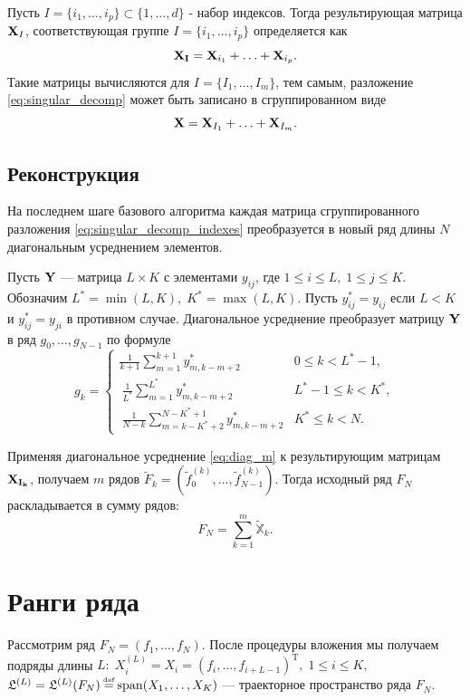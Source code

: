 \documentclass[specialist, substylefile = spbu.rtx,
			   subf, href, 12pt]{disser}
\newcommand\eqdef{\mathrel{\stackrel{\makebox[0pt]{\mbox{\normalfont\tiny def}}}{=}}}
\begin{document}
Пусть $I = \{i_1, \dotsc, i_p\} \subset \{1, \dotsc, d\}$ - набор индексов. Тогда результирующая матрица $\bold{X}_I$, соответствующая группе $I = \{i_1, \dotsc, i_p\}$ определяется как 
$$\bold{X_I} = \bold{X}_{i_1} + \dotsc + \bold{X}_{i_p}.$$
Такие матрицы вычисляются для $I = \{I_1, \dotsc, I_m\}$, тем самым, разложение \eqref{eq:singular_decomp} может быть записано в сгруппированном виде
\begin{equation}\label{eq:singular_decomp_indexes}
	\bold{X} = \bold{X}_{I_1} + \dotsc + \bold{X}_{I_m}.
\end{equation}

\subsection{Реконструкция}

На последнем шаге базового алгоритма каждая матрица сгруппированного разложения \eqref{eq:singular_decomp_indexes} преобразуется в новый ряд длины $ N $ диагональным усреднением элементов.

Пусть $\bold{Y}$ --- матрица $L \times K$ с элементами $y_{ij}$, где $1 \leq i \leq L,\; 1 \leq j \leq K$. Обозначим $L^* = \min(L, K), \; K^* = \max(L, K)$. Пусть $y_{ij}^* = y_{ij}$ если $L<K$ и $y_{ij}^* = y_{ji}$ в противном случае. Диагональное усреднение преобразует матрицу $\bold{Y}$ в ряд $g_0, \dotsc, g_{N-1}$ по формуле
\begin{equation}\label{eq:diag_m}
	g_k = 
	\begin{cases}
		\frac{1}{k+1}\sum\limits_{m=1}^{k+1}y_{m, k-m+2}^* & 0 \leq k < L^* -1, \\\
		\frac{1}{L^*}\sum\limits_{m=1}^{L^*}y_{m, k-m+2}^* & L^* - 1 \leq k < K^*, \\\
		\frac{1}{N-k}\sum\limits_{m=k - K^* + 2}^{N - K^* + 1}y_{m, k-m+2}^* & K^* \leq k < N.
	\end{cases}
\end{equation}

Применяя диагональное усреднение \eqref{eq:diag_m} к результирующим матрицам $\bold{X_{I_k}}$, получаем $m$ рядов $\widetilde{F}_{k} = (\widetilde{f}_0^{(k)}, \dotsc, \widetilde{f}_{N-1}^{(k)})$. Тогда исходный ряд $F_N$ раскладывается в сумму рядов:
$$F_N = \sum\limits_{k=1}^{m}\widetilde{\mathbb{X}}_k.$$

\section{Ранги ряда}
Рассмотрим ряд $F_N = (f_1,\dots,f_N)$. После процедуры вложения мы получаем подряды длины $L:\; X_i^{(L)} = X_i = (f_{i}, \dots, f_{i+L-1})^\mathrm{T}, \; 1 \leq i \leq K,$ $\mathfrak{L}^{(L)} = \mathfrak{L}^{(L)}(F_N) \eqdef \mathrm{span}(X_1, \dots, X_K)$ --- траекторное пространство ряда $F_N$.
\end{document}
